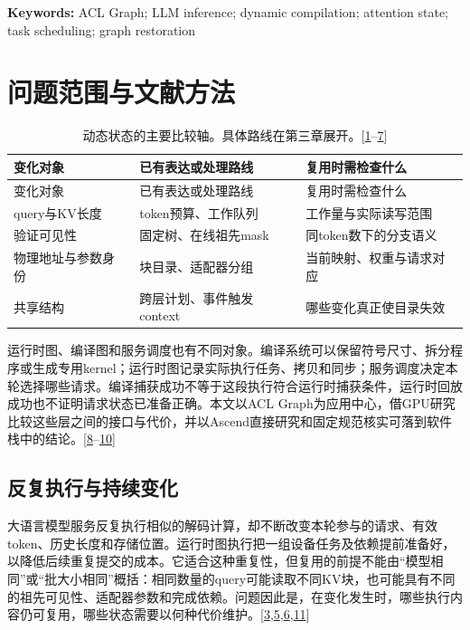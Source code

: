 \documentclass[
  UTF8,
  zihao=5]{ctexart}
\begin{document}
\textbf{Keywords:} ACL Graph; LLM inference; dynamic compilation;
attention state; task scheduling; graph restoration

\hypertarget{ux95eeux9898ux8303ux56f4ux4e0eux6587ux732eux65b9ux6cd5}{%
\section{问题范围与文献方法}\label{ux95eeux9898ux8303ux56f4ux4e0eux6587ux732eux65b9ux6cd5}}

\begin{longtable}[]{@{}lll@{}}
\caption{动态状态的主要比较轴。具体路线在第三章展开。{[}\protect\hyperlink{ref-agrawal2024sarathi}{1}--\protect\hyperlink{ref-ye2024chunkattention}{7}{]}}\tabularnewline
\toprule
变化对象 & 已有表达或处理路线 & 复用时需检查什么 \\
\midrule
\endfirsthead
\toprule
变化对象 & 已有表达或处理路线 & 复用时需检查什么 \\
\midrule
\endhead
query与KV长度 & token预算、工作队列 & 工作量与实际读写范围 \\
验证可见性 & 固定树、在线祖先mask & 同token数下的分支语义 \\
物理地址与参数身份 & 块目录、适配器分组 & 当前映射、权重与请求对应 \\
共享结构 & 跨层计划、事件触发context & 哪些变化真正使目录失效 \\
\bottomrule
\end{longtable}

运行时图、编译图和服务调度也有不同对象。编译系统可以保留符号尺寸、拆分程序或生成专用kernel；运行时图记录实际执行任务、拷贝和同步；服务调度决定本轮选择哪些请求。编译捕获成功不等于这段执行符合运行时捕获条件，运行时回放成功也不证明请求状态已准备正确。本文以ACL
Graph为应用中心，借GPU研究比较这些层之间的接口与代价，并以Ascend直接研究和固定规范核实可落到软件栈中的结论。{[}\protect\hyperlink{ref-ansel2024pytorch2}{8}--\protect\hyperlink{ref-liu2025xllm}{10}{]}

\hypertarget{ux53cdux590dux6267ux884cux4e0eux6301ux7eedux53d8ux5316}{%
\subsection{反复执行与持续变化}\label{ux53cdux590dux6267ux884cux4e0eux6301ux7eedux53d8ux5316}}

大语言模型服务反复执行相似的解码计算，却不断改变本轮参与的请求、有效token、历史长度和存储位置。运行时图执行把一组设备任务及依赖提前准备好，以降低后续重复提交的成本。它适合这种重复性，但复用的前提不能由``模型相同''或``批大小相同''概括：相同数量的query可能读取不同KV块，也可能具有不同的祖先可见性、适配器参数和完成依赖。问题因此是，在变化发生时，哪些执行内容仍可复用，哪些状态需要以何种代价维护。{[}\protect\hyperlink{ref-miao2024specinfer}{3},\protect\hyperlink{ref-kwon2023vllm}{5},\protect\hyperlink{ref-sheng2024slora}{6},\protect\hyperlink{ref-yu2022orca}{11}{]}
\end{document}
